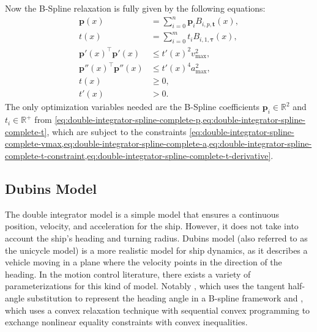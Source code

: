 Now the B-Spline relaxation is fully given by the following equations:
\begin{subequations}\label{eq:double-integrator-spline-complete}
    \begin{align}
        \mathbf{p}(x) &= \sum_{i=0}^{n} \mathbf{p}_i B_{i,p,\mathbf{t}}(x), \label{eq:double-integrator-spline-complete-p} \\
        t(x) &= \sum_{i=0}^{m} t_i B_{i,1,\boldsymbol{\tau}}(x), \label{eq:double-integrator-spline-complete-t} \\
        \mathbf{p}'(x) ^\top \mathbf{p}'(x) &\leq t'(x)^2v_{\max}^2, \label{eq:double-integrator-spline-complete-vmax} \\
        \mathbf{p}''(x) ^\top \mathbf{p}''(x) &\leq t'(x)^4a_{\max}^2, \label{eq:double-integrator-spline-complete-a} \\
        t(x) &\geq 0, \label{eq:double-integrator-spline-complete-t-constraint} \\
        t'(x) &> 0. \label{eq:double-integrator-spline-complete-t-derivative} \end{align}
\end{subequations}
The only optimization variables needed are the B-Spline coefficients $\mathbf{p}_i\in\mathbb{R}^2$ and $t_i\in\mathbb{R}^+$ from \cref{eq:double-integrator-spline-complete-p,eq:double-integrator-spline-complete-t}, which are subject to the constraints \cref{eq:double-integrator-spline-complete-vmax,eq:double-integrator-spline-complete-a,eq:double-integrator-spline-complete-t-constraint,eq:double-integrator-spline-complete-t-derivative}.


\subsection{Dubins Model}\label{sec:dubins-model}
The double integrator model is a simple model that ensures a continuous position, velocity, and acceleration for the ship. However, it does not take into account the ship's heading and turning radius. Dubins model (also referred to as the unicycle model) is a more realistic model for ship dynamics, as it describes a vehicle moving in a plane where the velocity points in the direction of the heading. In the motion control literature, there exists a variety of parameterizations for this kind of model. Notably \citet{mercy2017spline}, which uses the tangent half-angle substitution to represent the heading angle in a B-spline framework and \citet{Wang2020}, which uses a convex relaxation technique with sequential convex programming to exchange nonlinear equality constraints with convex inequalities. 

